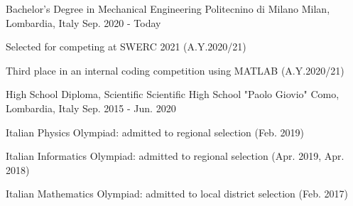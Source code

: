

\begin{cventries}

  \cventry
  {Bachelor's Degree in Mechanical Engineering} %
  {Politecnino di Milano} %
  {Milan, Lombardia, Italy} %
  {Sep. 2020 - Today} %
  {
    \begin{cvitems} %
      \item {Selected for competing at SWERC 2021 (A.Y.2020/21)}
      \item {Third place in an internal coding competition using MATLAB (A.Y.2020/21)}
    \end{cvitems}
  }


  \cventry
  {High School Diploma, Scientific} %
  {Scientific High School "Paolo Giovio"} %
  {Como, Lombardia, Italy} %
  {Sep. 2015 - Jun. 2020} %
  {
    \begin{cvitems} %
      \item {Italian Physics Olympiad: admitted to regional selection (Feb. 2019)}
      \item {Italian Informatics Olympiad: admitted to regional selection (Apr. 2019, Apr. 2018)}
      \item {Italian Mathematics Olympiad: admitted to local district selection (Feb. 2017)}
    \end{cvitems}
  }

\end{cventries}
